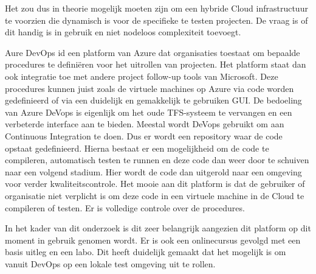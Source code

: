Het zou dus in theorie mogelijk moeten zijn om een hybride Cloud infrastructuur te voorzien die dynamisch is voor de specifieke te testen projecten. De vraag is of dit handig is in gebruik en niet nodeloos complexiteit toevoegt.

Aure DevOps id een platform van Azure dat organisaties toestaat om bepaalde procedures te definiëren voor het uitrollen van projecten. Het platform staat dan ook integratie toe met andere project follow-up tools van Microsoft. Deze procedures kunnen juist zoals de virtuele machines op Azure via code worden gedefinieerd of via een duidelijk en gemakkelijk te gebruiken GUI. De bedoeling van Azure DeVops is eigenlijk om het oude TFS-systeem te vervangen en een verbeterde interface aan te bieden. Meestal wordt DeVops gebruikt om aan Continuous Integration te doen. Dus er wordt een repository waar de code opstaat gedefinieerd. Hierna bestaat er een mogelijkheid om de code te compileren, automatisch testen te runnen en deze code dan weer door te schuiven naar een volgend stadium. Hier wordt de code dan uitgerold naar een omgeving voor verder kwaliteitscontrole. Het mooie aan dit platform is dat de gebruiker of organisatie niet verplicht is om deze code in een virtuele machine in de Cloud te compileren of testen. Er is volledige controle over de procedures.

In het kader van dit onderzoek is dit zeer belangrijk aangezien dit platform op dit moment in gebruik genomen wordt. Er is ook een onlinecursus gevolgd met een basis uitleg en een labo. Dit heeft duidelijk gemaakt dat het mogelijk is om vanuit DevOps op een lokale test omgeving uit te rollen.


